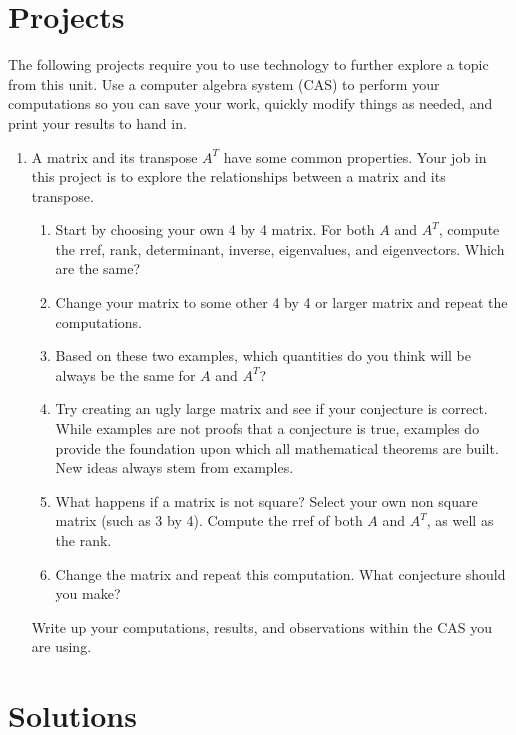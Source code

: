 \section{Projects}
The following projects require you to use technology to further explore a topic from this unit. Use a computer algebra system (CAS) to perform your computations so you can save your work, quickly modify things as needed, and print your results to hand in.
\begin{enumerate}
	\item A matrix and its transpose $A^T$ have some common properties. Your job in this project is to explore the relationships between a matrix and its transpose.	
	
\begin{enumerate}
	\item Start by choosing your own 4 by 4 matrix.  For both $A$ and $A^T$, compute the rref, rank, determinant, inverse, eigenvalues, and eigenvectors. Which are the same? 
	\item Change your matrix to some other 4 by 4 or larger matrix and repeat the computations. 
	\item Based on these two examples, which quantities do you think will be always be the same for $A$ and $A^T$? 
	\item Try creating an ugly large matrix and see if your conjecture is correct. While examples are not proofs that a conjecture is true, examples do provide the foundation upon which all mathematical theorems are built.  New ideas always stem from examples.
	\item What happens if a matrix is not square? Select your own non square matrix (such as 3 by 4). Compute the rref of both $A$ and $A^T$, as well as the rank. 
	\item Change the matrix and repeat this computation. What conjecture should you make?
\end{enumerate}
Write up your computations, results, and observations within the CAS you are using.
\end{enumerate}








\section{Solutions}




